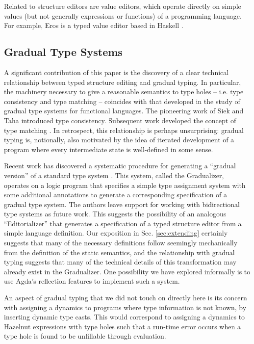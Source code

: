 \documentclass[9pt]{sigplanconf}
\begin{document}
Related to structure editors are value editors, which operate directly on
simple values (but not generally expressions or functions) of a programming
language. For example, Eros is a typed value editor based in
Haskell \cite{DBLP:conf/icfp/Elliott07}.


\subsection{Gradual Type Systems}
A significant contribution of this paper is the discovery of a clear
technical relationship between typed structure editing and gradual
typing. In particular, the machinery necessary to give a reasonable
semantics to type holes -- i.e. type consistency and type matching --
coincides with that developed in the study of gradual type systems for
functional languages. The pioneering work of Siek and Taha \cite{Siek06a}
introduced type consistency. Subsequent work developed the concept of type
matching \cite{DBLP:conf/popl/RastogiCH12,DBLP:conf/popl/GarciaC15}. In
retrospect, this relationship is perhaps unsurprising: gradual typing is,
notionally, also motivated by the idea of iterated development of a program
where every intermediate state is well-defined in some sense.

Recent work has discovered a systematic procedure for generating a
``gradual version'' of a standard type
system \cite{DBLP:conf/popl/CiminiS16}. This system, called the
Gradualizer, operates on a logic program that specifies a simple type
assignment system with some additional annotations to generate a
corresponding specification of a gradual type system. The authors leave
support for working with bidirectional type systems as future work. This
suggests the possibility of an analogous ``Editorializer'' that generates a
specification of a typed structure editor from a simple language
definition. Our exposition in Sec. \ref{sec:extending} certainly suggests
that many of the necessary definitions follow seemingly mechanically from
the definition of the static semantics, and the relationship with gradual
typing suggests that many of the technical details of this transformation
may already exist in the Gradualizer. One possibility we have explored
informally is to use Agda's reflection features to implement such a system.

An aspect of gradual typing that we did not touch on directly here is its
concern with assigning a dynamics to programs where type information is not
known, by inserting dynamic type casts. This would correspond to assigning
a dynamics to Hazelnut expressions with type holes such that a run-time
error occurs when a type hole is found to be unfillable through evaluation.
\end{document}
